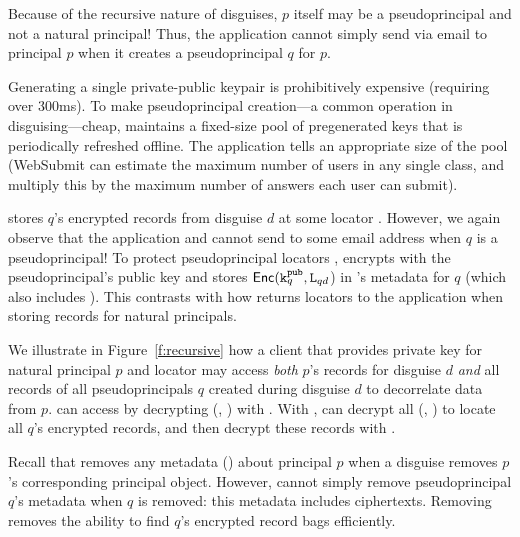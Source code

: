 Because of the recursive nature of disguises, $p$ itself may be a pseudoprincipal and not a natural
principal! Thus, the application cannot simply send  via \eg email to principal $p$ when it
creates a pseudoprincipal $q$ for $p$. 

Generating a single private-public keypair is prohibitively expensive (requiring over 300ms). To
make pseudoprincipal creation---a common operation in disguising---cheap, \sys maintains a
fixed-size pool of pregenerated keys that is periodically refreshed offline. The application tells
\sys an appropriate size of the pool (\eg WebSubmit can estimate the maximum number of users in any
single class, and multiply this by the maximum number of answers each user can submit).

\sys stores $q$'s encrypted records from disguise $d$ at some locator .  However, we again
observe that the application and \sys cannot send  to some email address when $q$ is a
pseudoprincipal!  To protect pseudoprincipal locators , \sys encrypts  with the
pseudoprincipal's public key  and stores $\mathsf{Enc}(\texttt{\ensuremath{\texttt{k}^{\text{pub}}_{q}}}, \texttt{L}_{qd}$) in \sys's metadata for $q$ (which
also includes ). This contrasts with how \sys returns locators to the application when
storing records for natural principals. 

We illustrate in Figure~\ref{f:recursive} how a client that provides private key  for
natural principal $p$ and locator  may access \emph{both} $p$'s records for disguise $d$
\emph{and} all records of all pseudoprincipals $q$ created during disguise $d$ to decorrelate data
from $p$.  \sys can access  by decrypting \enc(, ) with .  With
, \sys can decrypt all \enc(, ) to locate all $q$'s encrypted records,
and then decrypt these records with . 


Recall that \sys removes any metadata (\eg {}) about principal $p$ when a disguise removes
$p$'s corresponding principal object.
However, \sys cannot simply remove pseudoprincipal $q$'s metadata when $q$ is removed: this metadata
includes  ciphertexts. Removing  removes the ability to find $q$'s encrypted
record bags efficiently. 

